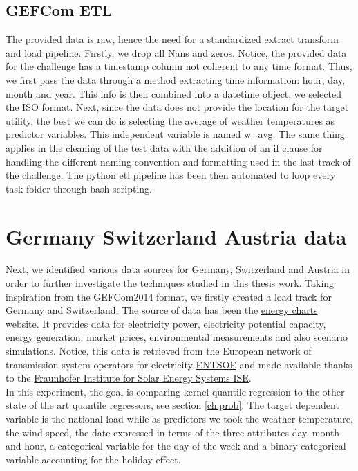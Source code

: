\subsection{GEFCom ETL}
The provided data is raw, hence the need for a standardized extract transform and load pipeline. 
Firstly, we drop all Nans and zeros. Notice, the provided data for the challenge has a timestamp column not coherent to any time format. Thus, we first pass the data through a method extracting time information: hour, day, month and year. This info is then combined into a datetime object, we selected the ISO format.
Next, since the data does not provide the location for the target utility, the best we can do is selecting the average of weather temperatures as predictor variables. This independent variable is named w\_avg.
The same thing applies in the cleaning of the test data with the addition of an if clause for handling the different naming convention and formatting used in the last track of the challenge. The python etl pipeline has been then automated to loop every task folder through bash scripting.


\section{Germany Switzerland Austria data}
Next, we identified various data sources for Germany, Switzerland and Austria in order to further
investigate the techniques studied in this thesis work.
Taking inspiration from the GEFCom2014 format, we firstly created a load track for Germany and Switzerland. 
The source of data has been the \href{https://www.energy-charts.info/index.html?l=en&c=DE}{energy charts} website. It provides data for electricity power, electricity potential capacity, energy generation, market prices, environmental measurements and also scenario simulations. Notice, this data is retrieved from the European network of transmission system operators for electricity \href{https://www.entsoe.eu/}{ENTSOE} and made available thanks to the \href{https://ise.fraunhofer.de/en.html}{Fraunhofer Institute for Solar Energy Systems ISE}.
\\
In this experiment, the goal is comparing kernel quantile regression to the other state of the art quantile regressors, see section \ref{ch:prob}.
The target dependent variable is the national load while as predictors we took
the weather temperature, the wind speed, the date expressed in terms of the three attributes day, month and hour, a categorical variable for the day of the week and a binary categorical variable accounting for the holiday effect.


